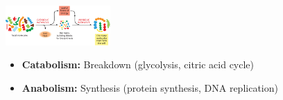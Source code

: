 \begin{minipage}{0.5\linewidth}
   \includegraphics[width=4cm]{src/images/energy_matter.png} 
\end{minipage}
\begin{minipage}{0.5\linewidth}
    \begin{itemize}
\item \textbf{Catabolism:} Breakdown (glycolysis, citric acid cycle)
\item \textbf{Anabolism:} Synthesis (protein synthesis, DNA replication)
\end{itemize}
\end{minipage}